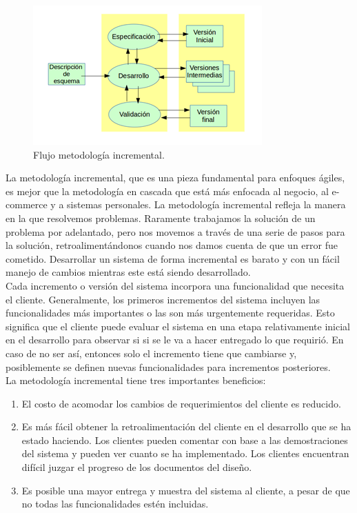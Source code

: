 \documentclass[12pt]{report}
\begin{document}
\begin{figure}[H]
\centering
\includegraphics[width = 12 cm, height = 7 cm]{incre}
\caption{Flujo metodología incremental.}
\end{figure}

La metodología incremental, que es una pieza fundamental para enfoques ágiles, es mejor que la metodología en cascada que está más enfocada al negocio, al e-commerce y a sistemas personales. La metodología incremental refleja la manera en la que resolvemos problemas. Raramente trabajamos la solución de un problema por adelantado, pero nos movemos a través de una serie de pasos para la solución, retroalimentándonos cuando nos damos cuenta de que un error fue cometido. Desarrollar un sistema de forma incremental es barato y con un fácil manejo de cambios mientras este está siendo desarrollado.\cite{meto}\\

Cada incremento o versión del sistema incorpora una funcionalidad que necesita el cliente. Generalmente, los primeros incrementos del sistema incluyen las funcionalidades más importantes o las son más urgentemente requeridas. Esto significa que el cliente puede evaluar el sistema en una etapa relativamente inicial en el desarrollo para observar si si se le va a hacer entregado lo que requirió. En caso de no ser así, entonces solo el incremento tiene que cambiarse y, posiblemente se definen nuevas funcionalidades para incrementos posteriores.\\

La metodología incremental tiene tres importantes beneficios:
\begin{enumerate}
\item El costo de acomodar los cambios de requerimientos del cliente es reducido.
\item  Es más fácil obtener la retroalimentación del cliente en el desarrollo que se ha estado haciendo. Los clientes pueden comentar con base a las demostraciones del sistema y pueden ver cuanto se ha implementado. Los clientes encuentran difícil juzgar el progreso de los documentos del diseño.
\item Es posible una mayor entrega y muestra del sistema al cliente, a pesar de que no todas las funcionalidades estén incluidas.
\end{enumerate}
\end{document}
